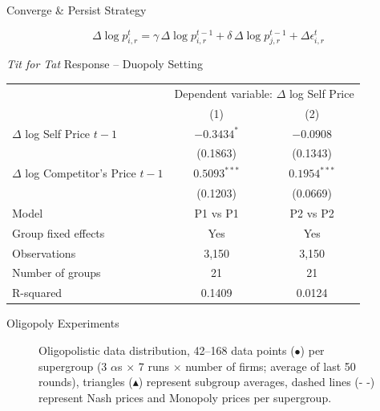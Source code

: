 \documentclass[10pt, aspectratio=169]{beamer}
\begin{document}
\begin{frame}{Converge \& Persist Strategy}
\begin{center}
 \begin{tcolorbox}[colback=gray!10, colframe=black, width=0.6\textwidth]
$$\Delta \log p_{i,r}^{t} = \gamma \, \Delta \log p_{i,r}^{t-1} + \delta \, \Delta \log p_{j,r}^{t-1} + \Delta \epsilon_{i,r}^t$$
\end{tcolorbox}   
\end{center}



\centering
\scriptsize %
\begin{threeparttable}
\caption{\emph{Tit for Tat} Response -- Duopoly Setting}
\begin{tabular}{lcc}
\toprule
& \multicolumn{2}{c}{Dependent variable: $\Delta$ log Self Price} \\
\cmidrule(lr){2-3}
& (1) & (2) \\
\midrule
$\Delta$ log Self Price $t-1$         & $-0.3434^{*}$ & $-0.0908$  \\
                             & (0.1863)       & (0.1343)       \\
$\Delta$ log Competitor's Price $t-1$ & $0.5093^{***}$ & $0.1954^{***}$ \\
                             & (0.1203)       & (0.0669)       \\
\midrule
Model                    & P1 vs P1       & P2 vs P2       \\          
Group fixed effects      & Yes            & Yes            \\
Observations             & 3,150          & 3,150          \\
Number of groups         & 21             & 21             \\
R-squared                & 0.1409         & 0.0124         \\
\bottomrule
\end{tabular}
\end{threeparttable}
\end{frame}


\begin{frame}{Oligopoly Experiments}
    \begin{figure}[htpb!]
        \centering
        
        \caption{Oligopolistic data distribution, 42--168 data points ($\bullet$) per supergroup (3 $\alpha$s $\times$ 7 runs $\times$ number of firms; average of last 50 rounds), triangles ($\blacktriangle$) represent subgroup averages, dashed lines ($\text{- -}$) represent Nash prices and Monopoly prices per supergroup.}
        \label{fig:oligopols}
    \end{figure}
\end{frame}
\end{document}
